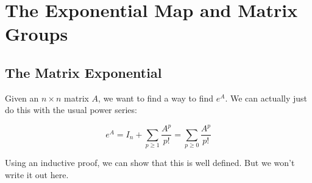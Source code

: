 \section{The Exponential Map and Matrix Groups}
\subsection{The Matrix Exponential}
Given an $n \times n$ matrix $A$, we want to find a way to find $e^A$. We can actually
just do this with the usual power series:

\begin{equation}\label{eq:1}
    e^A = I_n + \sum_{p \ge 1} \frac{A^p}{p!} = \sum_{p \ge 0} \frac{A^p}{p!}
\end{equation}

Using an inductive proof, we can show that this is well defined. But we won't write
it out here.

